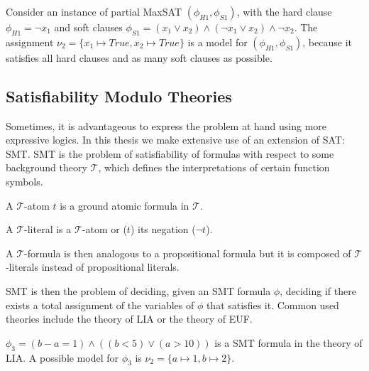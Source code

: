 \begin{example}
Consider an instance of partial \ac{MaxSAT} \((\phi_{H1}, \phi_{S1})\), with the hard clause \(\phi_{H1} = \neg x_1\) and soft clauses \(\phi_{S1} = (x_1 \lor x_2) \land (\neg x_1 \lor x_2) \land \neg x_2\). The assignment \(\nu_2 = \{x_1 \mapsto \textit{True}, x_2 \mapsto \textit{True}\}\) is a model for \((\phi_{H1}, \phi_{S1})\), because it satisfies all hard clauses and as many soft clauses as possible.
\end{example}



\subsection{Satisfiability Modulo Theories}

Sometimes, it is advantageous to express the problem at hand using more expressive logics. In this thesis we make extensive use of an extension of \ac{SAT}: \acf{SMT}. \ac{SMT} is the problem of satisfiability of formulas with respect to some background theory \(\mathcal{T}\), which defines the interpretations of certain function symbols.

\begin{definition}
A \(\mathcal{T}\)-atom \(t\) is a ground atomic formula in \(\mathcal{T}\).
\end{definition}


\begin{definition}
A \(\mathcal{T}\)-literal is a \(\mathcal{T}\)-atom  or (\(t\)) its negation (\(\neg t\)).
\end{definition}

\begin{definition}
A \(\mathcal{T}\)-formula is then analogous to a propositional formula but it is composed of \(\mathcal{T}\)-literals instead of propositional literals.
\end{definition}

\noindent
\ac{SMT} is then the problem of deciding, given an SMT formula \(\phi\), deciding if there exists a total assignment of the variables of \(\phi\) that satisfies it. Common used theories include the theory of \ac{LIA} or the theory of \ac{EUF}.

\begin{example}
\(\phi_3 = (b - a = 1) \land ((b < 5) \lor (a>10))\) is a \ac{SMT} formula in the theory of LIA. A possible model for \(\phi_3\) is \(\nu_2 = \{a \mapsto 1, b \mapsto 2\}\).
\end{example}


